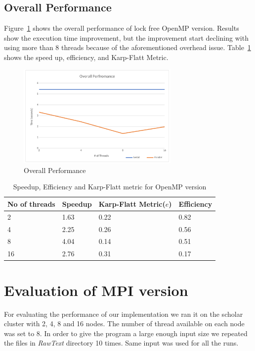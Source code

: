 \documentclass[12pt]{article}
\begin{document}
\subsection{Overall Performance}
Figure~\ref{fig:overall} shows the overall performance of lock free OpenMP version. Results show the execution time improvement, but the improvement start declining with using more than 8 threads because of the aforementioned overhead issue. 
Table~\ref{omp-tbl} shows the speed up, efficiency, and Karp-Flatt Metric.

\begin{figure}[H]
\centering
\includegraphics[width=0.7\textwidth]{fig/overall.png}
\caption{Overall Performance \label{fig:overall}}
\end{figure}

\begin{table}[ht]
\centering
\begin{tabular}{|l|l|l|l|}
\hline
    No of threads & Speedup & Karp-Flatt Metric($e$) & Efficiency \\ \hline
    2  & 1.63 & 0.22 & 0.82 \\ \hline
    4  & 2.25 & 0.26 & 0.56  \\ \hline
    8  & 4.04 & 0.14 & 0.51\\ \hline
    16 & 2.76 & 0.31 & 0.17 \\ \hline
\end{tabular}
    \caption{Speedup, Efficiency and Karp-Flatt metric for OpenMP version \label{omp-tbl}}
\end{table}

\section{Evaluation of MPI version}
For evaluating the performance of our implementation we ran it on the scholar cluster with 2, 4, 8 and 16 nodes. The number of thread available on each node was
set to 8. In order to give the program a large enough input size we repeated the files in {\em RawText} directory 10 times. Same input was used for all the runs. 
\end{document}
